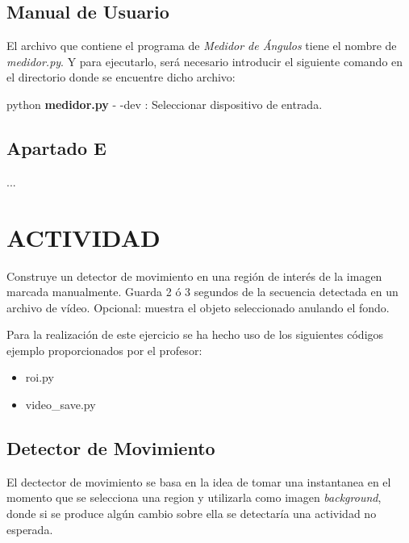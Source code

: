 \documentclass[a4paper]{article} %
\begin{document}
\subsection*{Manual de Usuario}

El archivo que contiene el programa de \textit{Medidor de Ángulos} tiene el nombre de \textit{medidor.py}. Y para ejecutarlo, será necesario introducir el siguiente comando en el directorio donde se encuentre dicho archivo:
\\
\begin{tcolorbox}[collower=red!75!black]
	python \textbf{medidor.py}
	\tcblower
	- -dev : Seleccionar dispositivo de entrada.
\end{tcolorbox}

\subsection{Apartado E}
...

\newpage


\section{ACTIVIDAD}
\bigskip

\begin{tcolorbox}[breakable,notitle,boxrule=0pt,colback=lightgray,colframe=lightgray]
Construye un detector de movimiento en una región de interés de la imagen marcada manualmente. Guarda 2 ó 3 segundos de la secuencia detectada en un archivo de vídeo. Opcional: muestra el objeto seleccionado anulando el fondo.
\end{tcolorbox}

Para la realización de este ejercicio se ha hecho uso de los siguientes códigos ejemplo proporcionados por el profesor:

\begin{itemize}
  \item roi.py
  \item video\_save.py
\end{itemize}

\subsection{Detector de Movimiento}
El dectector de movimiento se basa en la idea de tomar una instantanea en el momento que se selecciona una region y utilizarla como imagen \textit{background}, donde si se produce algún cambio sobre ella se detectaría una actividad no esperada.\\
\end{document}
